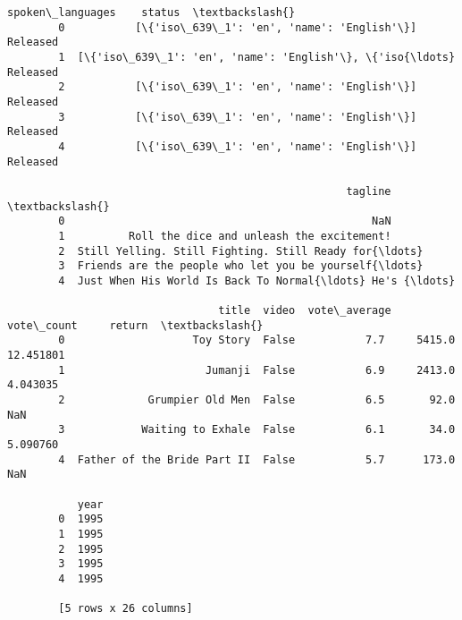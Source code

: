 \documentclass[11pt]{article}
\begin{document}
\begin{Verbatim}[commandchars=\\\{\}]
                                            spoken\_languages    status  \textbackslash{}
        0           [\{'iso\_639\_1': 'en', 'name': 'English'\}]  Released   
        1  [\{'iso\_639\_1': 'en', 'name': 'English'\}, \{'iso{\ldots}  Released   
        2           [\{'iso\_639\_1': 'en', 'name': 'English'\}]  Released   
        3           [\{'iso\_639\_1': 'en', 'name': 'English'\}]  Released   
        4           [\{'iso\_639\_1': 'en', 'name': 'English'\}]  Released   
        
                                                     tagline  \textbackslash{}
        0                                                NaN   
        1          Roll the dice and unleash the excitement!   
        2  Still Yelling. Still Fighting. Still Ready for{\ldots}   
        3  Friends are the people who let you be yourself{\ldots}   
        4  Just When His World Is Back To Normal{\ldots} He's {\ldots}   
        
                                 title  video  vote\_average vote\_count     return  \textbackslash{}
        0                    Toy Story  False           7.7     5415.0  12.451801   
        1                      Jumanji  False           6.9     2413.0   4.043035   
        2             Grumpier Old Men  False           6.5       92.0        NaN   
        3            Waiting to Exhale  False           6.1       34.0   5.090760   
        4  Father of the Bride Part II  False           5.7      173.0        NaN   
        
           year  
        0  1995  
        1  1995  
        2  1995  
        3  1995  
        4  1995  
        
        [5 rows x 26 columns]
\end{Verbatim}
            
\end{document}
